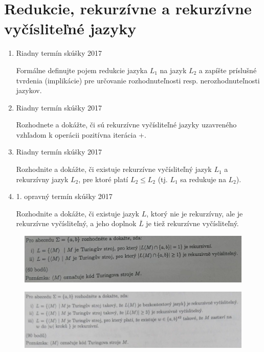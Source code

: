 \documentclass[]{article}
\begin{document}
	\section{Redukcie, rekurzívne a rekurzívne vyčísliteľné jazyky}
	\begin{enumerate}
		\item Riadny termín skúšky 2017
		
		Formálne definujte pojem redukcie jazyka $L_1$ na jazyk $L_2$ a zapíšte príslušné tvrdenia (implikácie) pre určovanie rozhodnuteľnosti resp. nerozhodnuteľnosti jazykov.
		
		\item Riadny termín skúšky 2017
		
		Rozhodnete a dokážte, či sú rekurzívne vyčísliteľné jazyky uzavreného vzhľadom k operácii pozitívna iterácia +.
		
		\item Riadny termín skúšky 2017
		
		Rozhodnite a dokážte, či existuje rekurzívne vyčísliteľný jazyk $L_1$ a rekurzívny jazyk $L_2$, pre ktoré platí $L_2 \leq L_2$ (tj. $L_1$ sa redukuje na $L_2$).
		
		\item 1. opravný termín skúšky 2017
		
		Rozhodnite a dokážte, či existuje jazyk $L$, ktorý nie je rekurzívny, ale je rekurzívne vyčísliteľný, a jeho doplnok $\overline{L}$ je tiež rekurzívne vyčísliteľný.
	\end{enumerate}
	
	\begin{figure}[H]
		\includegraphics[width=\textwidth]{tasks/redukcie/task4.png}
	\end{figure}

	\begin{figure}[H]
		\includegraphics[width=\textwidth]{tasks/redukcie/task6.png}
	\end{figure}
	
\end{document}
